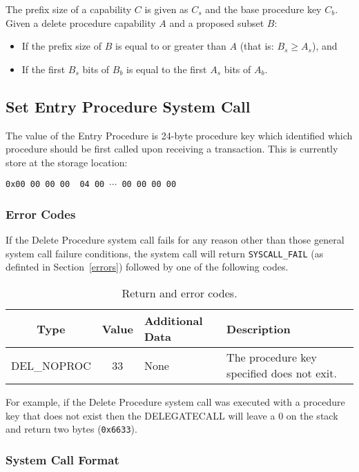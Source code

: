 \documentclass[english,a4paper]{article}
\let\oldparagraph\subsubsection
\renewcommand{\subsubsection}[1]{\oldparagraph{#1}\mbox{}}
\begin{document}
The prefix size of a capability $C$ is given as $C_s$ and the base procedure key
$C_b$. Given a delete procedure capability $A$ and a proposed subset $B$:
\begin{itemize}
  \item If the prefix size of $B$ is equal to or greater than $A$ (that is: $B_s
  \geq A_s$), and
  \item If the first $B_s$ bits of $B_b$ is equal to the first $A_s$ bits of
  $A_b$.
\end{itemize}

\subsection{Set Entry Procedure System Call}
The value of the Entry Procedure is 24-byte procedure key which identified which
procedure should be first called upon receiving a transaction. This is currently
store at the storage location:

\texttt{0x00 00 00 00 {\color{blue} 04} 00 $\cdots$ 00 00 00 00}

\subsubsection{Error Codes}
If the Delete Procedure system call fails for any reason other than those
general system call failure conditions, the system call will return
\texttt{SYSCALL\_FAIL} (as definted in Section~\ref{errors}) followed by one of
the following codes.

\begin{table}[H]
  \caption{Return and error codes.}
  \centering{}%
  \begin{tabularx}{\textwidth}{c|c|l|X}
    \hline
    Type & Value & Additional Data & Description \\
    \hline
    \hline
    DEL\_NOPROC  & 33 & None & The procedure key specified does not exit. \\
    \hline
  \end{tabularx}
\end{table}

For example, if the Delete
Procedure system call was executed with a procedure key that does not exist then
the DELEGATECALL will leave a 0 on the stack and return two bytes
(\texttt{0x6633}).

\subsubsection{System Call Format}
\end{document}
